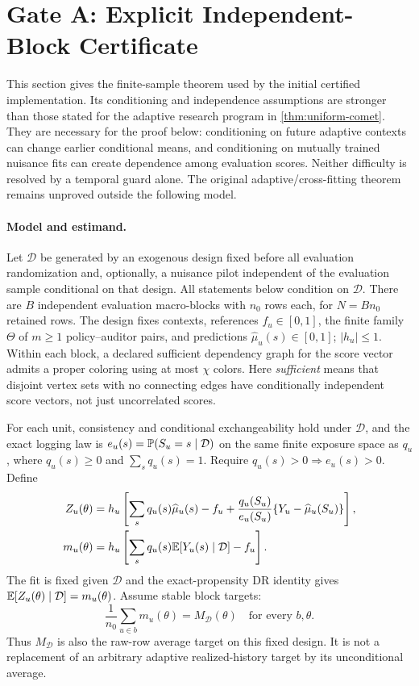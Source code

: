 \section{Gate A: Explicit Independent-Block Certificate}
\label{app:gate-a-certificate}

This section gives the finite-sample theorem used by the initial certified
implementation. Its conditioning and independence assumptions are stronger than
those stated for the adaptive research program in
\cref{thm:uniform-comet}. They are necessary for the proof below: conditioning
on future adaptive contexts can change earlier conditional means, and
conditioning on mutually trained nuisance fits can create dependence among
evaluation scores. Neither difficulty is resolved by a temporal guard alone.
The original adaptive/cross-fitting theorem remains unproved outside the
following model.

\paragraph{Model and estimand.}
Let $\mathcal D$ be generated by an exogenous design fixed before all
evaluation randomization and, optionally, a nuisance pilot independent of
the evaluation sample conditional on that design. All statements below
condition on $\mathcal D$. There are $B$ independent evaluation
macro-blocks with $n_0$ rows each, for $N=Bn_0$ retained rows. The design fixes contexts, references
$f_u\in[0,1]$, the finite family $\Theta$ of $m\ge1$ policy--auditor pairs,
and predictions $\widehat\mu_u(s)\in[0,1]$; $|h_u|\le1$.
Within each block, a declared sufficient dependency graph for the score
vector admits a proper coloring using at most $\chi$ colors. Here
\emph{sufficient} means that disjoint vertex sets with no connecting edges
have conditionally independent score vectors, not just uncorrelated scores.

For each unit, consistency and conditional exchangeability hold under
$\mathcal D$, and the exact logging law is
$e_u(s)=\mathbb{P}(S_u=s\mid\mathcal D)$ on the same finite exposure space as
$q_u$, where $q_u(s)\ge0$ and $\sum_s q_u(s)=1$.
Require $q_u(s)>0\Rightarrow e_u(s)>0$. Define
\begin{align}
Z_u(\theta)
&=h_u\left[
 \sum_s q_u(s)\widehat\mu_u(s)-f_u
 +\frac{q_u(S_u)}{e_u(S_u)}
       \{Y_u-\widehat\mu_u(S_u)\}\right],
\label{eq:gate-a-score}\\
m_u(\theta)
&=h_u\left[\sum_s q_u(s)\mathbb{E}[Y_u(s)\mid\mathcal D]-f_u\right].
\end{align}
The fit is fixed given $\mathcal D$ and the exact-propensity DR identity
gives $\mathbb{E}[Z_u(\theta)\mid\mathcal D]=m_u(\theta)$.
Assume stable block targets:
\begin{equation}
 \frac1{n_0}\sum_{u\in b}m_u(\theta)=M_{\mathcal D}(\theta)
 \quad\text{for every }b,\theta.
\label{eq:gate-a-target}
\end{equation}
Thus $M_{\mathcal D}$ is also the raw-row average target on this fixed
design. It is not a replacement of an arbitrary adaptive realized-history
target by its unconditional average.

